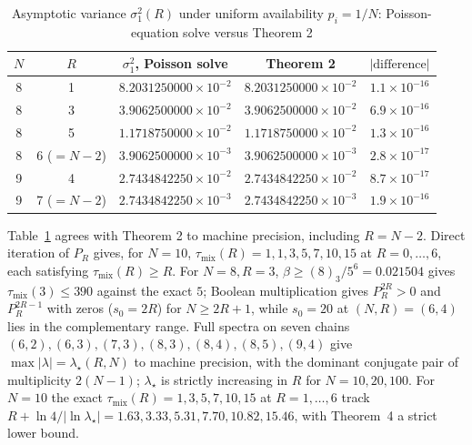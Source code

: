 \documentclass[twoside,11pt]{article}
\begin{document}
\begin{table}[!t]
\small
\centering
\begin{tabular}{@{}ccccc@{}}
\toprule
$N$ & $R$ & $\sigma_1^2$, Poisson solve & Theorem 2 & $|\mathrm{difference}|$ \\
\midrule
8 & 1 & $8.2031250000\times10^{-2}$ & $8.2031250000\times10^{-2}$ & $1.1\times10^{-16}$ \\
8 & 3 & $3.9062500000\times10^{-2}$ & $3.9062500000\times10^{-2}$ & $6.9\times10^{-16}$ \\
8 & 5 & $1.1718750000\times10^{-2}$ & $1.1718750000\times10^{-2}$ & $1.3\times10^{-16}$ \\
8 & 6 ($=N-2$) & $3.9062500000\times10^{-3}$ & $3.9062500000\times10^{-3}$ & $2.8\times10^{-17}$ \\
9 & 4 & $2.7434842250\times10^{-2}$ & $2.7434842250\times10^{-2}$ & $8.7\times10^{-17}$ \\
9 & 7 ($=N-2$) & $2.7434842250\times10^{-3}$ & $2.7434842250\times10^{-3}$ & $1.9\times10^{-16}$ \\
\bottomrule
\end{tabular}
\caption{Asymptotic variance $\sigma_1^2(R)$ under uniform availability $p_i=1/N$: Poisson-equation solve versus Theorem 2}
\label{table:I}
\end{table}

Table~\ref{table:I} agrees with Theorem 2 to machine precision, including
$R=N-2$. Direct iteration of $P_R$ gives, for $N=10$,
$\tau_{\mathrm{mix}}(R)=1,1,3,5,7,10,15$ at $R=0,\dots,6$, each satisfying
$\tau_{\mathrm{mix}}(R)\ge R$. For $N=8,R=3$,
$\beta\ge(8)_3/5^{6}=0.021504$ gives $\tau_{\mathrm{mix}}(3)\le390$ against
the exact $5$; Boolean multiplication gives $P_R^{2R}>0$ and
$P_R^{2R-1}$ with zeros ($s_0=2R$) for $N\ge2R+1$, while $s_0=20$ at
$(N,R)=(6,4)$ lies in the complementary range. Full spectra on seven chains
$(6,2),(6,3),(7,3),(8,3),(8,4),(8,5),(9,4)$ give
$\max|\lambda|=\lambda_\star(R,N)$ to machine precision, with the dominant
conjugate pair of multiplicity $2(N-1)$; $\lambda_\star$ is strictly
increasing in $R$ for $N=10,20,100$. For $N=10$ the exact
$\tau_{\mathrm{mix}}(R)=1,3,5,7,10,15$ at $R=1,\dots,6$ track
$R+\ln4/|\ln\lambda_\star|=1.63,3.33,5.31,7.70,10.82,15.46$, with
Theorem~4 a strict lower bound.
\end{document}
